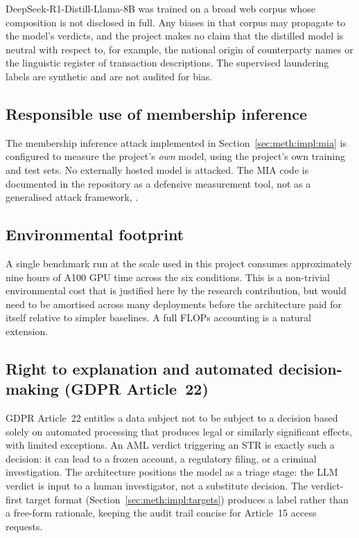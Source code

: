 \documentclass{report}
\begin{document}
DeepSeek-R1-Distill-Llama-8B was trained on a broad web corpus whose composition is not disclosed in full. Any biases in that corpus may propagate to the model's verdicts, and the project makes no claim that the distilled model is neutral with respect to, for example, the national origin of counterparty names or the linguistic register of transaction descriptions. The supervised laundering labels are synthetic and are not audited for bias.

\subsection{Responsible use of membership inference}

The membership inference attack implemented in Section~\ref{sec:meth:impl:mia} is configured to measure the project's \emph{own} model, using the project's own training and test sets. No externally hosted model is attacked. The MIA code is documented in the repository as a defensive measurement tool, not as a generalised attack framework, .

\subsection{Environmental footprint}

A single benchmark run at the scale used in this project consumes approximately nine hours of A100 GPU time across the six conditions. This is a non-trivial environmental cost that is justified here by the research contribution, but would need to be amortised across many deployments before the architecture paid for itself relative to simpler baselines. A full FLOPs accounting is a natural extension.

\subsection{Right to explanation and automated decision-making (GDPR Article~22)}

GDPR Article~22 entitles a data subject not to be subject to a decision based solely on automated processing that produces legal or similarly significant effects, with limited exceptions. An AML verdict triggering an STR is exactly such a decision: it can lead to a frozen account, a regulatory filing, or a criminal investigation. The architecture positions the model as a triage stage: the LLM verdict is input to a human investigator, not a substitute decision. The verdict-first target format (Section~\ref{sec:meth:impl:targets}) produces a label rather than a free-form rationale, keeping the audit trail concise for Article~15 access requests.
\end{document}
